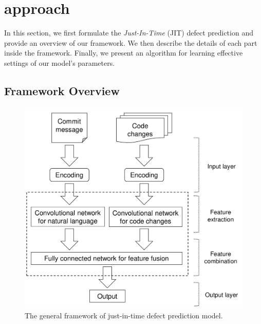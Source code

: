 \section{approach}
\label{sec:approach}
In this section, we first formulate the \emph{Just-In-Time} (JIT) defect prediction and provide an overview of our framework. We then describe the details of each part inside the framework. Finally, we present an algorithm for learning effective settings of our model's parameters. 
\subsection{Framework Overview}
\label{sec:overview}

\begin{figure}
\center
\includegraphics[scale=0.36]{figs/framework.pdf}
\caption{The general framework of just-in-time defect prediction model.}
\label{fig:overview}
\end{figure}

